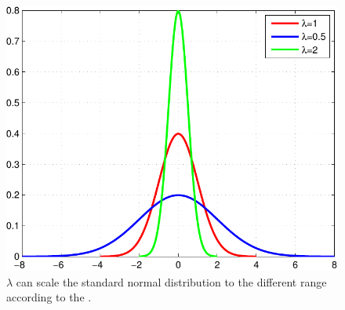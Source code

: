 \begin{figure}[hbp]
    \centering
    \includegraphics[width=0.6\columnwidth]{Simulation/different_lambda.pdf}
    \caption{$\lambda$ can scale the standard normal distribution to the different range according to the .}
    \label{fig:differentlambda}
    \vspace{-2mm}
\end{figure}
